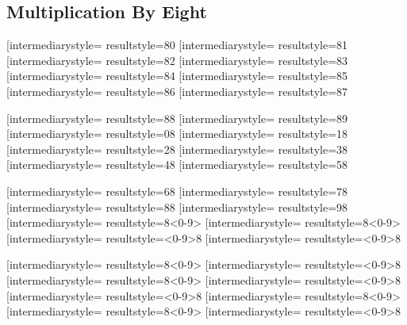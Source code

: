 \documentclass[letterpaper, 17pt]{article}
\newcommand{\white}[1]{}
\begin{document}
\begin{center}
	\section*{Multiplication By Eight}

	\opmul[intermediarystyle=\white, resultstyle=\white]{8}{0}\qquad
	\opmul[intermediarystyle=\white, resultstyle=\white]{8}{1}\qquad
	\opmul[intermediarystyle=\white, resultstyle=\white]{8}{2}\qquad
	\opmul[intermediarystyle=\white, resultstyle=\white]{8}{3}\qquad
	\opmul[intermediarystyle=\white, resultstyle=\white]{8}{4}\qquad
	\opmul[intermediarystyle=\white, resultstyle=\white]{8}{5}\qquad
	\opmul[intermediarystyle=\white, resultstyle=\white]{8}{6}\qquad
	\opmul[intermediarystyle=\white, resultstyle=\white]{8}{7}\qquad

	\vspace{0.3in}

	\opmul[intermediarystyle=\white, resultstyle=\white]{8}{8}\qquad
	\opmul[intermediarystyle=\white, resultstyle=\white]{8}{9}\qquad
	\opmul[intermediarystyle=\white, resultstyle=\white]{0}{8}\qquad
	\opmul[intermediarystyle=\white, resultstyle=\white]{1}{8}\qquad
	\opmul[intermediarystyle=\white, resultstyle=\white]{2}{8}\qquad
	\opmul[intermediarystyle=\white, resultstyle=\white]{3}{8}\qquad
	\opmul[intermediarystyle=\white, resultstyle=\white]{4}{8}\qquad
	\opmul[intermediarystyle=\white, resultstyle=\white]{5}{8}\qquad

	\vspace{0.3in}

	\opmul[intermediarystyle=\white, resultstyle=\white]{6}{8}\qquad
	\opmul[intermediarystyle=\white, resultstyle=\white]{7}{8}\qquad
	\opmul[intermediarystyle=\white, resultstyle=\white]{8}{8}\qquad
	\opmul[intermediarystyle=\white, resultstyle=\white]{9}{8}\qquad
	\opmul[intermediarystyle=\white, resultstyle=\white]{8}{<0-9>}\qquad
	\opmul[intermediarystyle=\white, resultstyle=\white]{8}{<0-9>}\qquad
	\opmul[intermediarystyle=\white, resultstyle=\white]{<0-9>}{8}\qquad
	\opmul[intermediarystyle=\white, resultstyle=\white]{<0-9>}{8}\qquad

	\vspace{0.3in}

	\opmul[intermediarystyle=\white, resultstyle=\white]{8}{<0-9>}\qquad
	\opmul[intermediarystyle=\white, resultstyle=\white]{<0-9>}{8}\qquad
	\opmul[intermediarystyle=\white, resultstyle=\white]{8}{<0-9>}\qquad
	\opmul[intermediarystyle=\white, resultstyle=\white]{<0-9>}{8}\qquad
	\opmul[intermediarystyle=\white, resultstyle=\white]{<0-9>}{8}\qquad
	\opmul[intermediarystyle=\white, resultstyle=\white]{8}{<0-9>}\qquad
	\opmul[intermediarystyle=\white, resultstyle=\white]{8}{<0-9>}\qquad
	\opmul[intermediarystyle=\white, resultstyle=\white]{<0-9>}{8}\qquad


\end{center}
\end{document}
